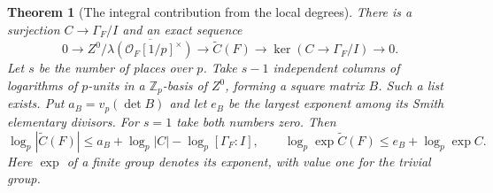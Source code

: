 \documentclass[a4paper,11pt]{article}
\newtheorem{theorem}[proposition]{Theorem}
\theoremstyle{definition}
\theoremstyle{remark}
\newcommand{\ZZ}{\mathbb Z}\newcommand{\ord}{\operatorname{ord}}
\numberwithin{equation}{section}
\begin{document}
\begin{theorem}[The integral contribution from the local degrees]\leavevmode
\label{thm:logunits319}
There is a surjection \(C\to\Gamma_F/I\) and an exact sequence
\[
 0\longrightarrow
 Z^0/\overline{\lambda(\mathcal O_F[1/p]^\times)}
 \longrightarrow \widetilde C(F)
 \longrightarrow \ker(C\to\Gamma_F/I)\longrightarrow0.
\]
Let \(s\) be the number of places over \(p\). Take \(s-1\)
independent columns of logarithms of \(p\)-units in a
\(\ZZ_p\)-basis of \(Z^0\), forming a square matrix \(B\).
Such a list exists. Put \(a_B=v_p(\det B)\) and let \(e_B\)
be the largest exponent among its Smith elementary divisors.
For \(s=1\) take both numbers zero. Then
\[
 \log_p|\widetilde C(F)|\le
       a_B+\log_p|C|-\log_p[\Gamma_F:I],
 \qquad
 \log_p\exp\widetilde C(F)\le e_B+\log_p\exp C .
\]
Here \(\exp\) of a finite group denotes its exponent, with
value one for the trivial group.
\end{theorem}
\end{document}
